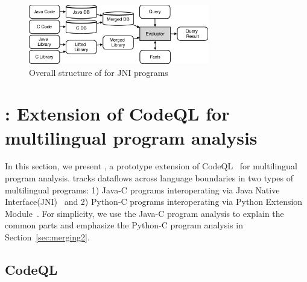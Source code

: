 \begin{figure}[t]
  \centering
  \vspace{2mm}
  \includegraphics[width=0.7\textwidth]{img/codeql.pdf}
  \caption{Overall structure of \ours for JNI programs}
  \label{fig:codeql}
\end{figure}

\section{\ours: Extension of CodeQL for multilingual program analysis}\label{sec:impl}
In this section, we present \ours, a prototype extension of
CodeQL~\cite{codeql} for multilingual program analysis.  \ours tracks
dataflows across language boundaries in two types of multilingual programs:
1) Java-C programs interoperating via Java Native Interface(JNI)~\cite{jnispec} and
2) Python-C programs interoperating via Python Extension Module~\cite{pyext}.
For simplicity, we use the Java-C program analysis to explain the common
parts and emphasize the Python-C program analysis in Section~\ref{sec:merging2}.




\subsection{CodeQL}

